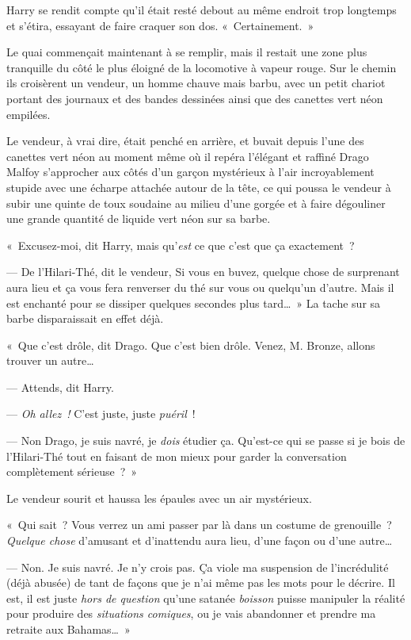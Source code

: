 Harry se rendit compte qu'il était resté debout au même endroit trop longtemps et s'étira, essayant de faire craquer son dos. «~Certainement.~»

Le quai commençait maintenant à se remplir, mais il restait une zone plus tranquille du côté le plus éloigné de la locomotive à vapeur rouge. Sur le chemin ils croisèrent un vendeur, un homme chauve mais barbu, avec un petit chariot portant des journaux et des bandes dessinées ainsi que des canettes vert néon empilées.

Le vendeur, à vrai dire, était penché en arrière, et buvait depuis l'une des canettes vert néon au moment même où il repéra l'élégant et raffiné Drago Malfoy s'approcher aux côtés d'un garçon mystérieux à l'air incroyablement stupide avec une écharpe attachée autour de la tête, ce qui poussa le vendeur à subir une quinte de toux soudaine au milieu d'une gorgée et à faire dégouliner une grande quantité de liquide vert néon sur sa barbe.

«~Excusez-moi, dit Harry, mais qu'\emph{est} ce que c'est que ça exactement~?

--- De l'Hilari-Thé, dit le vendeur, Si vous en buvez, quelque chose de surprenant aura lieu et ça vous fera renverser du thé sur vous ou quelqu'un d'autre. Mais il est enchanté pour se dissiper quelques secondes plus tard…~» La tache sur sa barbe disparaissait en effet déjà.

«~Que c'est drôle, dit Drago. Que c'est bien drôle. Venez, M. Bronze, allons trouver un autre…

--- Attends, dit Harry.

--- \emph{Oh allez~!} C'est juste, juste \emph{puéril}~!

--- Non Drago, je suis navré, je \emph{dois} étudier ça. Qu'est-ce qui se passe si je bois de l'Hilari-Thé tout en faisant de mon mieux pour garder la conversation complètement sérieuse~?~»

Le vendeur sourit et haussa les épaules avec un air mystérieux.

«~Qui sait~? Vous verrez un ami passer par là dans un costume de grenouille~? \emph{Quelque chose} d'amusant et d'inattendu aura lieu, d'une façon ou d'une autre…

--- Non. Je suis navré. Je n'y crois pas. Ça viole ma suspension de l'incrédulité (déjà abusée) de tant de façons que je n'ai même pas les mots pour le décrire. Il est, il est juste \emph{hors de question} qu'une satanée \emph{boisson} puisse manipuler la réalité pour produire des \emph{situations comiques}, ou je vais abandonner et prendre ma retraite aux Bahamas…~»

